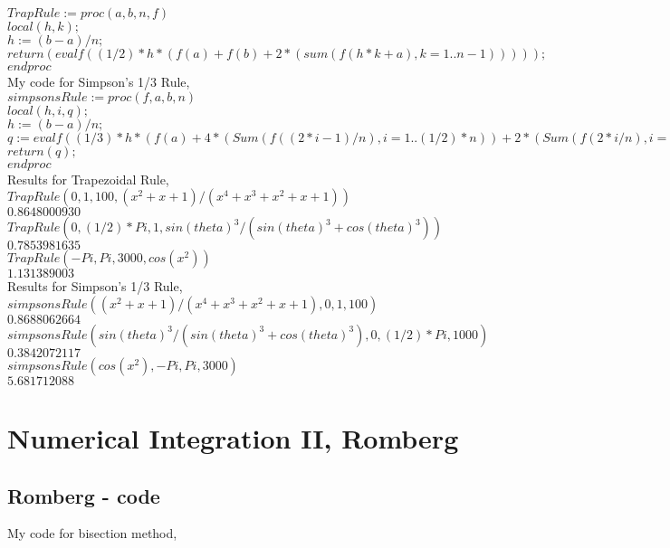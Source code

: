 \documentclass[12pt]{article}
\begin{document}
$TrapRule:=proc(a,b,n,f)$\\
$local(h, k);$\\
$h := (b-a)/n;$\\
$return(evalf((1/2)*h*(f(a)+f(b)+2*(sum(f(h*k+a), k = 1 .. n-1)))));$\\
$end proc$\\


My code for Simpson's 1/3 Rule,\\

$simpsonsRule:=proc(f,a,b,n)$\\
$local(h, i, q);$\\
$h := (b-a)/n;$\\
$q := evalf((1/3)*h*(f(a)+4*(Sum(f((2*i-1)/n), i = 1 .. (1/2)*n))+2*(Sum(f(2*i/n), i = 1 .. (1/2)*n))+f(b)));$\\
$return(q);$\\
$end proc$\\

Results for Trapezoidal Rule,
$TrapRule(0, 1, 100, (x^2+x+1)/(x^4+x^3+x^2+x+1))$\\
$0.8648000930$\\

$TrapRule(0, (1/2)*Pi, 1, sin(theta)^3/(sin(theta)^3+cos(theta)^3))$\\
$0.7853981635$\\

$TrapRule(-Pi, Pi, 3000, cos(x^2))$\\
$1.131389003$\\

\clearpage
Results for Simpson's 1/3 Rule,
$simpsonsRule((x^2+x+1)/(x^4+x^3+x^2+x+1), 0, 1, 100)$\\
$0.8688062664$\\

$simpsonsRule(sin(theta)^3/(sin(theta)^3+cos(theta)^3), 0, (1/2)*Pi, 1000)$\\
$0.3842072117$\\

$simpsonsRule(cos(x^2), -Pi, Pi, 3000)$\\
$5.681712088$\\
\section{Numerical Integration II, Romberg}
\subsection{Romberg - code}
My code for bisection method,\\
\end{document}
